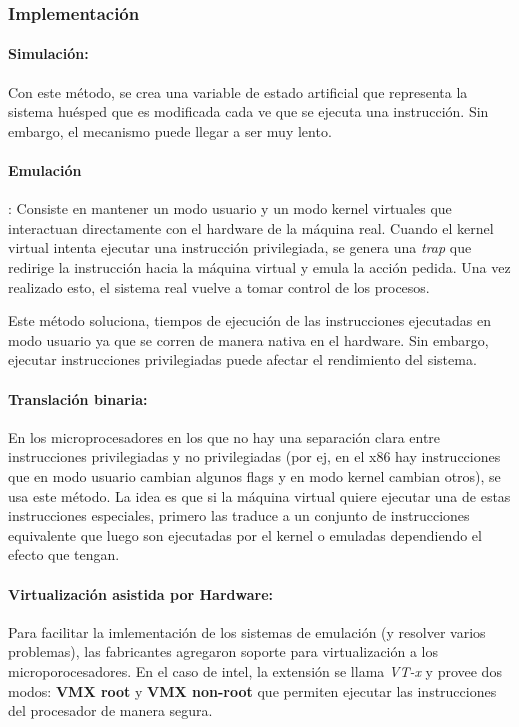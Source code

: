 \subsubsection{Implementación}
\paragraph{Simulación:} Con este método, se crea una variable de estado artificial que representa la sistema huésped que es modificada cada ve que se ejecuta una instrucción. Sin embargo, el mecanismo puede llegar a ser muy lento.

\paragraph{Emulación}: Consiste en mantener un modo usuario y un modo kernel virtuales que interactuan directamente con el hardware de la máquina real. Cuando el kernel virtual intenta ejecutar una instrucción privilegiada, se genera una \textit{trap} que redirige la instrucción hacia la máquina virtual y emula la acción pedida. Una vez realizado esto, el sistema real vuelve a tomar control de los procesos.

Este método soluciona, tiempos de ejecución de las instrucciones ejecutadas en modo usuario ya que se corren de manera nativa en el hardware. Sin embargo, ejecutar instrucciones privilegiadas puede afectar el rendimiento del sistema.

\paragraph{Translación binaria:} En los microprocesadores en los que no hay una separación clara entre instrucciones privilegiadas y no privilegiadas (por ej, en el x86 hay instrucciones que en modo usuario cambian algunos flags y en modo kernel cambian otros), se usa este método. La idea es que si la máquina virtual quiere ejecutar una de estas instrucciones especiales, primero las traduce a un conjunto de instrucciones equivalente que luego son ejecutadas por el kernel o emuladas dependiendo el efecto que tengan.

\paragraph{Virtualización asistida por Hardware:} Para facilitar la imlementación de los sistemas de emulación (y resolver varios problemas), las fabricantes agregaron soporte para virtualización a los microporocesadores. En el caso de intel, la extensión se llama \textit{VT-x} y provee dos modos: \textbf{VMX root} y \textbf{VMX non-root} que permiten ejecutar las instrucciones del procesador de manera segura.


